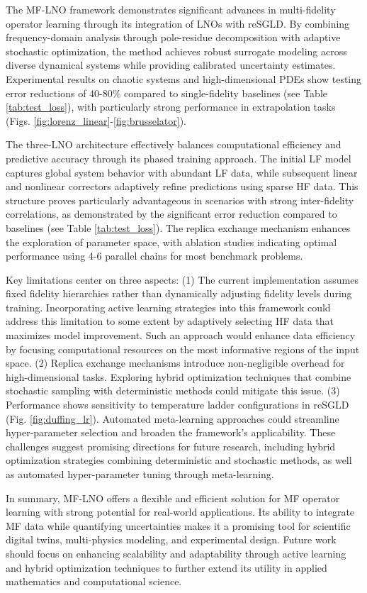 

The MF-LNO framework demonstrates significant advances in multi-fidelity operator learning through its integration of LNOs with reSGLD. By combining frequency-domain analysis through pole-residue decomposition with adaptive stochastic optimization, the method achieves robust surrogate modeling across diverse dynamical systems while providing calibrated uncertainty estimates. Experimental results on chaotic systems and high-dimensional PDEs show testing error reductions of 40-80\% compared to single-fidelity baselines (see Table \ref{tab:test_loss}), with particularly strong performance in extrapolation tasks (Figs. \ref{fig:lorenz_linear}-\ref{fig:brusselator}).

The three-LNO architecture effectively balances computational efficiency and predictive accuracy through its phased training approach. The initial LF model captures global system behavior with abundant LF data, while subsequent linear and nonlinear correctors adaptively refine predictions using sparse HF data. This structure proves particularly advantageous in scenarios with strong inter-fidelity correlations, as demonstrated by the significant error reduction compared to baselines (see Table \ref{tab:test_loss}). The replica exchange mechanism enhances the exploration of parameter space, with ablation studies indicating optimal performance using 4-6 parallel chains for most benchmark problems.

Key limitations center on three aspects: (1) The current implementation assumes fixed fidelity hierarchies rather than dynamically adjusting fidelity levels during training. Incorporating active learning strategies into this framework could address this limitation to some extent by adaptively selecting HF data that maximizes model improvement. Such an approach would enhance data efficiency by focusing computational resources on the most informative regions of the input space. (2) Replica exchange mechanisms introduce non-negligible overhead for high-dimensional tasks. Exploring hybrid optimization techniques that combine stochastic sampling with deterministic methods could mitigate this issue. (3) Performance shows sensitivity to temperature ladder configurations in reSGLD (Fig. \ref{fig:duffing_lr}). Automated meta-learning approaches could streamline hyper-parameter selection and broaden the framework's applicability. These challenges suggest promising directions for future research, including hybrid optimization strategies combining deterministic and stochastic methods, as well as automated hyper-parameter tuning through meta-learning.

In summary, MF-LNO offers a flexible and efficient solution for MF operator learning with strong potential for real-world applications. Its ability to integrate MF data while quantifying uncertainties makes it a promising tool for scientific digital twins, multi-physics modeling, and experimental design. Future work should focus on enhancing scalability and adaptability through active learning and hybrid optimization techniques to further extend its utility in applied mathematics and computational science.


